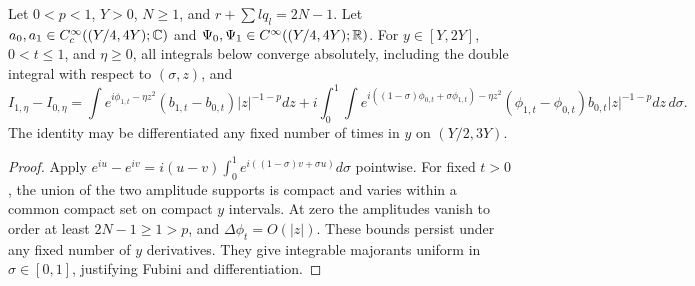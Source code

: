 \begin{lemma}
  \label{lem:c03_mult_interpolation_integral}
  Let $0<p<1$, $Y>0$, $N\ge1$, and $r+\sum lq_l=2N-1$.
  Let $a_0,a_1\in C_c^\infty((Y/4,4Y);\mathbb{C})$ and $\Psi_0,\Psi_1\in C^\infty((Y/4,4Y);\mathbb{R})$.
  For $y\in[Y,2Y]$, $0<t\le1$, and $\eta\ge0$, all integrals below converge absolutely, including
  the double integral with respect to $(\sigma,z)$, and
  \[
    I_{1,\eta}-I_{0,\eta}
     =\int e^{i\phi_{1,t}-\eta z^2}(b_{1,t}-b_{0,t})|z|^{-1-p}dz
      +i\int_0^1\!\int e^{i((1-\sigma)\phi_{0,t}+\sigma\phi_{1,t})-\eta z^2}
                   (\phi_{1,t}-\phi_{0,t})b_{0,t}|z|^{-1-p}dz\,d\sigma.
  \]
  The identity may be differentiated any fixed number of times in $y$ on $(Y/2,3Y)$.
\end{lemma}
\begin{proof}
  Apply $e^{iu}-e^{iv}=i(u-v)\int_0^1e^{i((1-\sigma)v+\sigma u)}d\sigma$ pointwise.
  For fixed $t>0$, the union of the two amplitude supports is compact and varies within a common
  compact set on compact $y$ intervals. At zero the amplitudes vanish to order at least $2N-1\ge1>p$,
  and $\Delta\phi_t=O(|z|)$. These bounds persist under any fixed number of $y$ derivatives.
  They give integrable majorants uniform in $\sigma\in[0,1]$, justifying Fubini and differentiation.
\end{proof}

